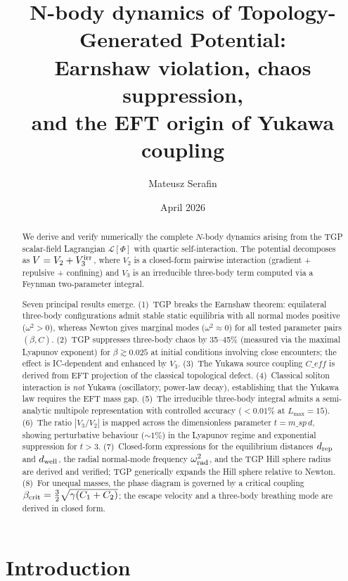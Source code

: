 \documentclass[11pt,a4paper]{article}
\title{%
  \textbf{N-body dynamics of Topology-Generated Potential:}\\[4pt]
  Earnshaw violation, chaos suppression,\\
  and the EFT origin of Yukawa coupling%
}
\author{Mateusz Serafin}
\date{April 2026}
\def\msp{m\_sp}%
\def\Ceff{C\_eff}%
\newcommand{\msp}{m_{\rm sp}}
\newcommand{\drep}{d_{\rm rep}}
\newcommand{\dwell}{d_{\rm well}}
\newcommand{\Ceff}{C_{\rm eff}}
\begin{document}
\maketitle

\begin{abstract}
We derive and verify numerically the complete $N$-body dynamics arising
from the TGP scalar-field Lagrangian $\mathcal{L}[\Phi]$ with quartic
self-interaction.  The potential decomposes as $V = V_2 + V_3^{\rm irr}$,
where $V_2$ is a closed-form pairwise interaction (gradient + repulsive +
confining) and $V_3$ is an irreducible three-body term computed via a
Feynman two-parameter integral.

Seven principal results emerge.  (1)~TGP breaks the Earnshaw theorem:
equilateral three-body configurations admit stable static equilibria with
all normal modes positive ($\omega^2 > 0$), whereas Newton gives marginal
modes ($\omega^2 \approx 0$) for all tested parameter pairs $(\beta,C)$.
(2)~TGP suppresses three-body chaos by 35--45\% (measured via the
maximal Lyapunov exponent) for $\beta \gtrsim 0.025$ at initial
conditions involving close encounters; the effect is IC-dependent and
enhanced by $V_3$.  (3)~The Yukawa source coupling $\Ceff$ is derived
from EFT projection of the classical topological defect.
(4)~Classical soliton interaction is \emph{not} Yukawa (oscillatory,
power-law decay), establishing that the Yukawa law requires the EFT mass
gap.  (5)~The irreducible three-body integral admits a semi-analytic
multipole representation with controlled accuracy ($<0.01\%$ at
$L_{\max}=15$).  (6)~The ratio $|V_3/V_2|$ is mapped across the
dimensionless parameter $t = \msp\,d$, showing perturbative behaviour
($\sim1\%$) in the Lyapunov regime and exponential suppression for
$t > 3$.  (7)~Closed-form expressions for the equilibrium distances
$\drep$ and $\dwell$, the radial normal-mode frequency
$\omega_{\rm rad}^2$, and the TGP Hill sphere radius are derived and
verified; TGP generically expands the Hill sphere relative to Newton.
(8)~For unequal masses, the phase diagram is governed by a critical
coupling $\beta_{\rm crit} = \tfrac{3}{2}\sqrt{\gamma(C_1+C_2)}$;
the escape velocity and a three-body breathing mode are derived in
closed form.
\end{abstract}

\tableofcontents

\section{Introduction}
\label{sec:introduction}
\end{document}
